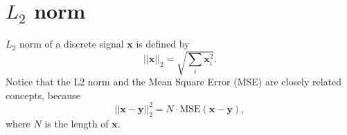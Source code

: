 
\section{$L_2$ norm}
\label{sec:L2_norm}

$L_2$ norm of a discrete signal $\mathbf{x}$ is defined by
\begin{equation}
  ||\mathbf{x}||_2 = \sqrt{\sum_i\mathbf{x}_i^2}.
\end{equation}
Notice that the L2 norm and the Mean Square Error (MSE) are closely
related concepts, because
\begin{equation}
  ||\mathbf{x} - \mathbf{y}||_2^2 = N\cdot\text{MSE}(\mathbf{x} - \mathbf{y}),
\end{equation}
where $N$ is the length of $\mathbf{x}$.


